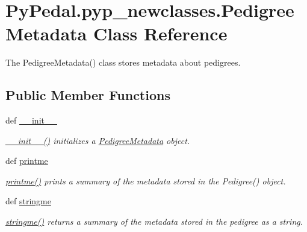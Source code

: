 \hypertarget{classPyPedal_1_1pyp__newclasses_1_1PedigreeMetadata}{
\section{PyPedal.pyp\_\-newclasses.PedigreeMetadata Class Reference}
\label{classPyPedal_1_1pyp__newclasses_1_1PedigreeMetadata}
}


The PedigreeMetadata() class stores metadata about pedigrees.  


\subsection*{Public Member Functions}
\begin{DoxyCompactItemize}
\item 
def \hyperlink{classPyPedal_1_1pyp__newclasses_1_1PedigreeMetadata_a105725f2e02e846685c702105d9c75a4}{\_\-\_\-init\_\-\_\-}
\begin{DoxyCompactList}\small\item\em \hyperlink{classPyPedal_1_1pyp__newclasses_1_1PedigreeMetadata_a105725f2e02e846685c702105d9c75a4}{\_\-\_\-init\_\-\_\-()} initializes a \hyperlink{classPyPedal_1_1pyp__newclasses_1_1PedigreeMetadata}{PedigreeMetadata} object. \item\end{DoxyCompactList}\item 
def \hyperlink{classPyPedal_1_1pyp__newclasses_1_1PedigreeMetadata_a7f23e64e27bd497a11e64aee955654d9}{printme}
\begin{DoxyCompactList}\small\item\em \hyperlink{classPyPedal_1_1pyp__newclasses_1_1PedigreeMetadata_a7f23e64e27bd497a11e64aee955654d9}{printme()} prints a summary of the metadata stored in the Pedigree() object. \item\end{DoxyCompactList}\item 
def \hyperlink{classPyPedal_1_1pyp__newclasses_1_1PedigreeMetadata_a4f6249ec84966de2733ec856b4763e2a}{stringme}
\begin{DoxyCompactList}\small\item\em \hyperlink{classPyPedal_1_1pyp__newclasses_1_1PedigreeMetadata_a4f6249ec84966de2733ec856b4763e2a}{stringme()} returns a summary of the metadata stored in the pedigree as a string. \item\end{DoxyCompactList}\item 

\end{DoxyCompactItemize}
